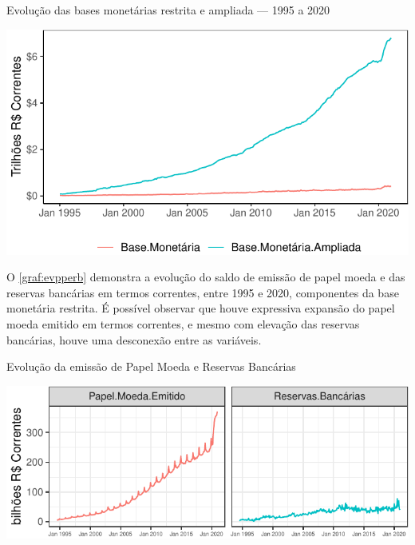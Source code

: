 \documentclass[
  12pt,
  12pt,
  openright,
  oneside,
  a4paper,
  chapter=TITLE,
  section=TITLE,
  subsection=TITLE,
  subsubsection=TITLE,
  portugues,
  sumario=tradicional]{abntex2}
\begin{document}
\begin{grafico}[!htbp]
\vspace{20pt}
\caption{Evolução das bases monetárias restrita e ampliada — 1995 a 2020}
\vspace{-4mm}

\begin{center}\includegraphics{12-exportedfigures/money.base.d-1} \end{center}
\vspace{-3mm}
\label{graf:moneybases}
\vspace{-2mm}
\end{grafico}

O \autoref{graf:evpperb} demonstra a evolução do saldo de emissão de papel moeda e das reservas bancárias em termos correntes, entre 1995 e 2020, componentes da base monetária restrita. É possível observar que houve expressiva expansão do papel moeda emitido em termos correntes, e mesmo com elevação das reservas bancárias, houve uma desconexão entre as variáveis.

\begin{grafico}[!htbp]
\vspace{20pt}
\caption{Evolução da emissão de Papel Moeda e Reservas Bancárias}
\vspace{-4mm}

\begin{center}\includegraphics{12-exportedfigures/base.moneybase.e-1} \end{center}
\vspace{-3mm}
\label{graf:evpperb}
\vspace{-2mm}
\end{grafico}
\end{document}
